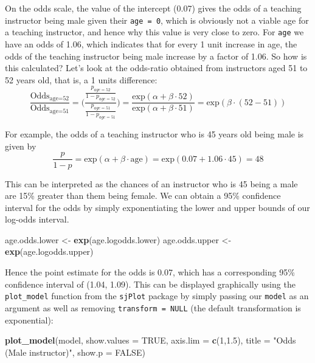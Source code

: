 \documentclass[]{article}
\newenvironment{Shaded}{\begin{snugshade}}{\end{snugshade}}
\newcommand{\KeywordTok}[1]{\textcolor[rgb]{0.13,0.29,0.53}{\textbf{#1}}}
\newcommand{\DataTypeTok}[1]{\textcolor[rgb]{0.13,0.29,0.53}{#1}}
\newcommand{\DecValTok}[1]{\textcolor[rgb]{0.00,0.00,0.81}{#1}}
\newcommand{\FloatTok}[1]{\textcolor[rgb]{0.00,0.00,0.81}{#1}}
\newcommand{\StringTok}[1]{\textcolor[rgb]{0.31,0.60,0.02}{#1}}
\newcommand{\OtherTok}[1]{\textcolor[rgb]{0.56,0.35,0.01}{#1}}
\newcommand{\NormalTok}[1]{#1}
\begin{document}
On the odds scale, the value of the intercept (0.07) gives the odds of a
teaching instructor being male given their \texttt{age\ =\ 0}, which is
obviously not a viable age for a teaching instructor, and hence why this
value is very close to zero. For \texttt{age} we have an odds of 1.06,
which indicates that for every 1 unit increase in age, the odds of the
teaching instructor being male increase by a factor of 1.06. So how is
this calculated? Let's look at the odds-ratio obtained from instructors
aged 51 to 52 years old, that is, a 1 units difference:
\[\frac{\mbox{Odds}_{\mbox{age=52}}}{\mbox{Odds}_{\mbox{age=51}}} = \Bigg( \frac{ \frac{p_{age=52}}{1-p_{age=52}} } { \frac{p_{age=51}}{1-p_{age=51}} } \Bigg) = \frac{\mbox{exp}(\alpha + \beta \cdot 52)}{\mbox{exp}(\alpha + \beta \cdot 51)} = {\mbox{exp}(\beta \cdot (52 - 51))}\]

For example, the odds of a teaching instructor who is 45 years old being
male is given by
\[\frac{p}{1-p}= \mbox{exp}(\alpha + \beta \cdot \mbox{age}) = \mbox{exp}( 0.07 + 1.06 \cdot 45) = 48\]

This can be interpreted as the chances of an instructor who is 45 being
a male are 15\% greater than them being female. We can obtain a 95\%
confidence interval for the odds by simply exponentiating the lower and
upper bounds of our log-odds interval.

\begin{Shaded}
\begin{Highlighting}[]
\NormalTok{age.odds.lower <-}\StringTok{ }\KeywordTok{exp}\NormalTok{(age.logodds.lower)}
\NormalTok{age.odds.upper <-}\StringTok{ }\KeywordTok{exp}\NormalTok{(age.logodds.upper)}
\end{Highlighting}
\end{Shaded}

Hence the point estimate for the odds is 0.07, which has a corresponding
95\% confidence interval of (1.04, 1.09). This can be displayed
graphically using the \texttt{plot\_model} function from the
\texttt{sjPlot} package by simply passing our \texttt{model} as an
argument as well as removing \texttt{transform\ =\ NULL} (the default
transformation is exponential):

\begin{Shaded}
\begin{Highlighting}[]
\KeywordTok{plot_model}\NormalTok{(model, }\DataTypeTok{show.values =} \OtherTok{TRUE}\NormalTok{, }\DataTypeTok{axis.lim =} \KeywordTok{c}\NormalTok{(}\DecValTok{1}\NormalTok{,}\FloatTok{1.5}\NormalTok{), }
           \DataTypeTok{title =} \StringTok{"Odds (Male instructor)"}\NormalTok{, }\DataTypeTok{show.p =} \OtherTok{FALSE}\NormalTok{)}
\end{Highlighting}
\end{Shaded}
\end{document}
